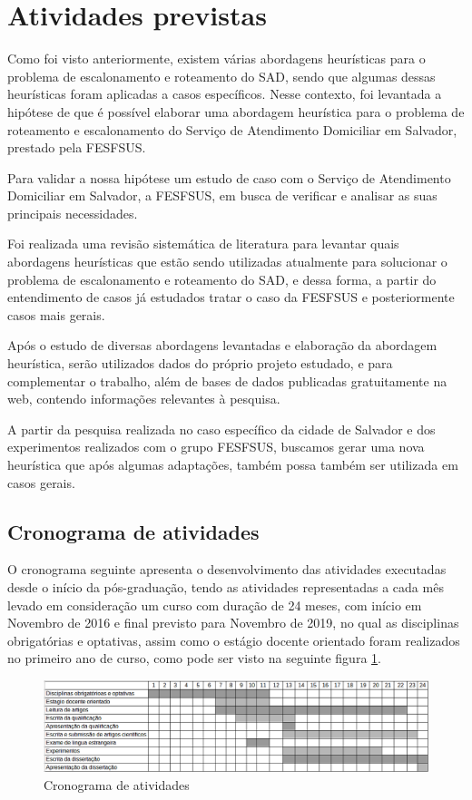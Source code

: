 \section{Atividades previstas}
Como foi visto anteriormente, existem várias abordagens heurísticas para o problema de escalonamento e roteamento do \ac{SAD}, sendo que algumas dessas heurísticas foram aplicadas a casos específicos. Nesse contexto, foi levantada a hipótese de que é possível elaborar uma abordagem heurística para o problema de roteamento e escalonamento do Serviço de Atendimento Domiciliar em Salvador, prestado pela \ac{FESFSUS}.

Para validar a nossa hipótese um estudo de caso com o Serviço de Atendimento Domiciliar em Salvador, a \ac{FESFSUS}, em busca de verificar e analisar as suas principais necessidades.

Foi realizada uma revisão sistemática de literatura para levantar quais abordagens heurísticas que estão sendo utilizadas atualmente para solucionar o problema de escalonamento e roteamento do \ac{SAD}, e dessa forma, a partir do entendimento de casos já estudados tratar o caso da \ac{FESFSUS} e posteriormente casos mais gerais.

Após o estudo de diversas abordagens levantadas e elaboração da abordagem heurística, serão utilizados dados do próprio projeto estudado, e para complementar o trabalho, além de bases de dados publicadas gratuitamente na web, contendo informações relevantes à pesquisa.

A partir da pesquisa realizada no caso específico da cidade de Salvador e dos experimentos realizados com o grupo \ac{FESFSUS}, buscamos gerar uma nova heurística que após algumas adaptações, também possa também ser utilizada em casos gerais.

\subsection{Cronograma de atividades}

O cronograma seguinte apresenta o desenvolvimento das atividades executadas desde o início da pós-graduação, tendo as atividades representadas a cada mês levado em consideração um curso com duração de 24 meses, com início em Novembro de 2016 e final previsto para Novembro de 2019, no qual as disciplinas obrigatórias e optativas, assim como o estágio docente orientado foram realizados no primeiro ano de curso, como pode ser visto na seguinte figura \ref{cronograma_atividade}.

\begin{figure}[H]
\includegraphics[width=1 \textwidth]{cronograma_atividades.png}
\begin{center}
\caption{Cronograma de atividades \label{cronograma_atividade}}
\end{center}
\end{figure}

